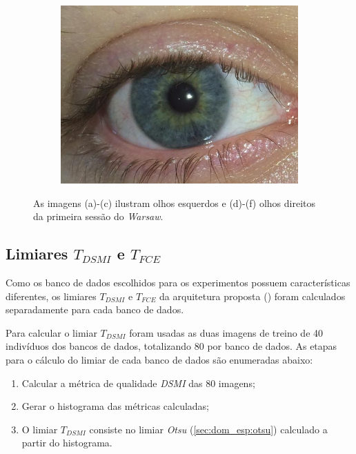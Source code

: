 \begin{figure}[H]
\begin{subfigure}{0.25\textwidth}
  \includegraphics[width=\linewidth]{img/Resultados/warsaw/right_68.jpg}
  \caption{}
\end{subfigure}
\caption{As imagens (a)-(c) ilustram olhos esquerdos e (d)-(f) olhos direitos da primeira sessão do \textit{\acrshort{Warsaw}}.}
\label{fig:experimentos:warsaw_1}
\end{figure}

\FloatBarrier

\subsection{Limiares $T_{DSMI}$ e $T_{FCE}$} \label{sec:experimentos:db:limiares}

\par Como os banco de dados escolhidos para os experimentos possuem características diferentes, os limiares $T_{DSMI}$ e $T_{FCE}$ da arquitetura proposta () foram calculados separadamente para cada banco de dados.

\par Para calcular o limiar $T_{DSMI}$ foram usadas as duas imagens de treino de 40 indivíduos dos bancos de dados, totalizando 80 por banco de dados. As etapas para o cálculo do limiar de cada banco de dados são enumeradas abaixo:

\begin{enumerate}
    \item Calcular a métrica de qualidade \textit{\acrshort{DSMI}} das 80 imagens;
    \item Gerar o histograma das métricas calculadas;
    \item O limiar $T_{DSMI}$ consiste no limiar \textit{Otsu} (\ref{sec:dom_esp:otsu}) calculado a partir do histograma.
\end{enumerate}

